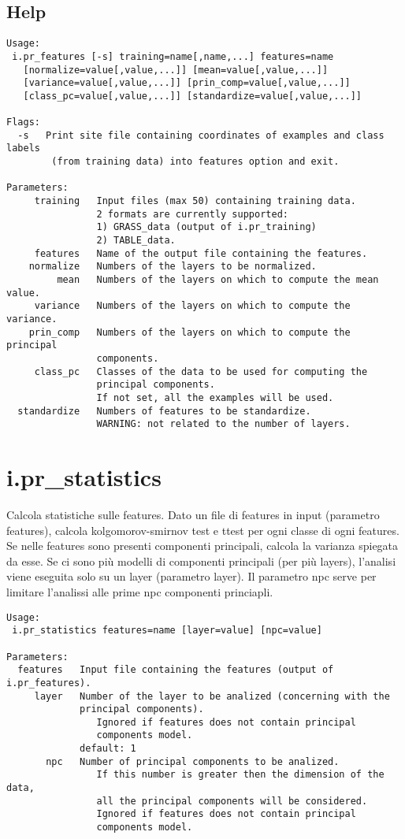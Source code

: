 \subsection*{Help}
\begin{verbatim}
Usage:
 i.pr_features [-s] training=name[,name,...] features=name
   [normalize=value[,value,...]] [mean=value[,value,...]]
   [variance=value[,value,...]] [prin_comp=value[,value,...]]
   [class_pc=value[,value,...]] [standardize=value[,value,...]]

Flags:
  -s   Print site file containing coordinates of examples and class labels
        (from training data) into features option and exit.

Parameters:
     training   Input files (max 50) containing training data.
                2 formats are currently supported:
                1) GRASS_data (output of i.pr_training)
                2) TABLE_data.
     features   Name of the output file containing the features.
    normalize   Numbers of the layers to be normalized.
         mean   Numbers of the layers on which to compute the mean value.
     variance   Numbers of the layers on which to compute the variance.
    prin_comp   Numbers of the layers on which to compute the principal
                components.
     class_pc   Classes of the data to be used for computing the
                principal components.
                If not set, all the examples will be used.
  standardize   Numbers of features to be standardize.
                WARNING: not related to the number of layers.
\end{verbatim}

\section{i.pr\_statistics}
Calcola statistiche sulle features. Dato un file di features in input
(parametro features), calcola kolgomorov-smirnov test e t\-test per
ogni classe di ogni features. Se nelle features sono presenti
componenti principali, calcola la varianza spiegata da esse. Se ci
sono pi\`{u} modelli di componenti principali (per pi\`{u} layers),
l'analisi viene eseguita solo su un layer (parametro layer). Il
parametro npc serve per limitare l'analissi alle prime npc componenti
princiapli.

\begin{verbatim}
Usage:
 i.pr_statistics features=name [layer=value] [npc=value]

Parameters:
  features   Input file containing the features (output of i.pr_features).
     layer   Number of the layer to be analized (concerning with the
             principal components).
                Ignored if features does not contain principal
                components model.
             default: 1
       npc   Number of principal components to be analized.
                If this number is greater then the dimension of the data,
                all the principal components will be considered.
                Ignored if features does not contain principal
                components model.
\end{verbatim}

